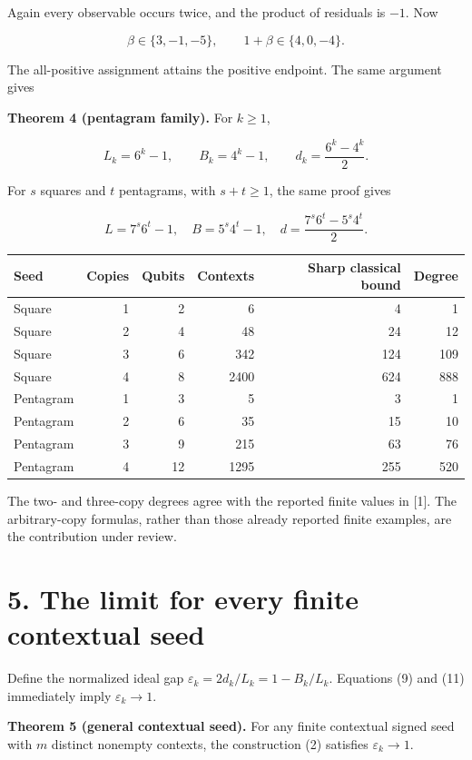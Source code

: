 \documentclass[10pt,a4paper]{article}
\begin{document}
Again every observable occurs twice, and the product of residuals is \(-1\). Now

\[\beta\in\{3,-1,-5\},\qquad 1+\beta\in\{4,0,-4\}. \tag{10}\]

The all-positive assignment attains the positive endpoint. The same argument gives

\textbf{Theorem 4 (pentagram family).} For \(k\ge1\),

\[L_k=6^k-1,\qquad B_k=4^k-1,\qquad
d_k=\frac{6^k-4^k}{2}. \tag{11}\]

For \(s\) squares and \(t\) pentagrams, with \(s+t\ge1\), the same proof gives

\[L=7^s6^t-1,\quad B=5^s4^t-1,\quad
d=\frac{7^s6^t-5^s4^t}{2}. \tag{12}\]

{\def\LTcaptype{table} %
\begin{longtable}[]{@{}lrrrrr@{}}
\toprule\noalign{}
Seed & Copies & Qubits & Contexts & Sharp classical bound & Degree \\
\midrule\noalign{}
\endhead
\bottomrule\noalign{}
\endlastfoot
Square & 1 & 2 & 6 & 4 & 1 \\
Square & 2 & 4 & 48 & 24 & 12 \\
Square & 3 & 6 & 342 & 124 & 109 \\
Square & 4 & 8 & 2400 & 624 & 888 \\
Pentagram & 1 & 3 & 5 & 3 & 1 \\
Pentagram & 2 & 6 & 35 & 15 & 10 \\
Pentagram & 3 & 9 & 215 & 63 & 76 \\
Pentagram & 4 & 12 & 1295 & 255 & 520 \\
\end{longtable}
}

The two- and three-copy degrees agree with the reported finite values in {[}1{]}. The arbitrary-copy formulas, rather than those already reported finite examples, are the contribution under review.

\section{5. The limit for every finite contextual seed}\label{the-limit-for-every-finite-contextual-seed}

Define the normalized ideal gap \(\varepsilon_k=2d_k/L_k=1-B_k/L_k\). Equations (9) and (11) immediately imply \(\varepsilon_k\to1\).

\textbf{Theorem 5 (general contextual seed).} For any finite contextual signed seed with \(m\) distinct nonempty contexts, the construction (2) satisfies \(\varepsilon_k\to1\).
\end{document}

